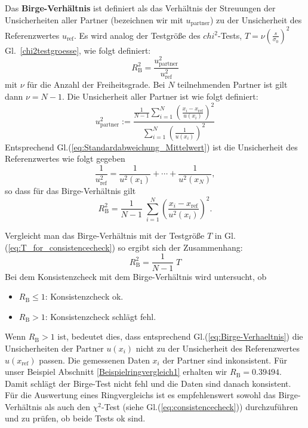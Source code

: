 Das \textbf{Birge-Verhältnis} ist definiert als das Verhältnis der Streuungen der Unsicherheiten aller Partner 
(bezeichnen wir mit $u_\mathrm{partner}$) zu der Unsicherheit des Referenzwertes $u_\mathrm{ref}$. Es wird
analog der Testgröße des $chi^2$-Tests, $T = \nu \left(\frac{s}{\sigma_0}\right)^2$ Gl.~\ref{chi2testgroesse}, wie
folgt definiert:
\begin{equation}
R_\mathrm{B}^2 = \frac{u^2_\mathrm{partner}}{u^2_\mathrm{ref}}
\end{equation}
mit $\nu$ für die Anzahl der Freiheitsgrade. Bei $N$ teilnehmenden Partner ist gilt dann
$\nu = N-1$.
Die Unsicherheit aller Partner ist wie folgt definiert:
\begin{equation}
u^2_\mathrm{partner} := \frac{\frac{1}{N-1}\sum\limits_{i=1}^{N} \left(\frac{x_i-x_\mathrm{ref}}{u(x_i)}\right)^2}
{\sum\limits_{i=1}^{N} \left(\frac{1}{u(x_i)} \right)^2}
\end{equation}
Entsprechend Gl.(\ref{eq:Standardabweichung_Mittelwert}) ist die Unsicherheit des Referenzwertes wie folgt gegeben
\begin{equation}
\frac{1}{u_\mathrm{ref}^2} = \frac{1}{u^2(x_1)} +  \cdots + \frac{1}{u^2(x_N)},
\end{equation}
so dass für das Birge-Verhältnis gilt
\begin{equation}
R_\mathrm{B}^2 = \frac{1}{N-1} \; \sum_{i=1}^N \left( \frac{x_i-x_\mathrm{ref}}{u^2(x_i)} \right)^2 .
		\label{eq:Birge-Verhaeltnis}
\end{equation}

Vergleicht man das Birge-Verhältnis mit der Testgröße $T$ in Gl.(\ref{eq:T_for_consistencecheck}) so ergibt sich der Zusammenhang:
\begin{equation} 
R_\mathrm{B}^2 = \frac{1}{N-1} \; T
\end{equation}
Bei dem Konsistenzcheck mit dem Birge-Verhältnis wird untersucht, ob  
\begin{itemize}
	\item $R_\mathrm{B} \le 1$: Konsistenzcheck ok. 
	\item $R_\mathrm{B} > 1$: Konsistenzcheck schlägt fehl.
\end{itemize}
Wenn $R_\mathrm{B} > 1$ ist, bedeutet dies, dass entsprechend Gl.(\ref{eq:Birge-Verhaeltnis}) die Unsicherheiten der Partner 
$u(x_i)$ nicht zu der Unsicherheit des Referenzwertes $u(x_\mathrm{ref})$ passen.
Die gemessenen Daten $x_i$ der Partner sind inkonsistent.
Für unser Beispiel Abschnitt \ref{Beispielringvergleich1} erhalten wir $R_\mathrm{B} = 0.39494$.
Damit schlägt der Birge-Test nicht fehl und die Daten sind 
danach konsistent. Für die Auswertung eines Ringvergleichs ist es empfehlenswert sowohl das Birge-Verhältnis als auch den $\chi^2$-Test
(siehe Gl.(\ref{eq:consistencecheck})) durchzuführen und zu prüfen, ob beide Tests ok sind. 


